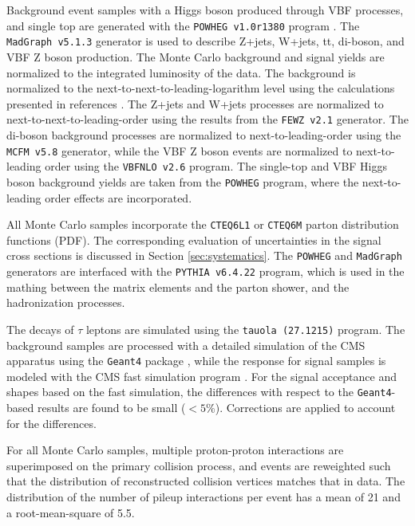 Background event samples with a Higgs boson produced through VBF processes, and single top are generated with the \texttt{POWHEG v1.0r1380} program \cite{Frixione:2007vw}. 
The \texttt{MadGraph v5.1.3} generator is used to describe Z+jets, W+jets, tt, di-boson, and VBF Z boson production. The Monte Carlo background and signal yields are normalized to the integrated luminosity of the data. 
The \ttbar background is normalized to the next-to-next-to-leading-logarithm level using the calculations presented in references \cite{Czakon:2013goa,Melnikov:2006kv}. 
The Z+jets and W+jets processes are normalized to next-to-next-to-leading-order using the results from the \texttt{FEWZ v2.1} \cite{Gavin:2010az} generator. 
The di-boson background processes are normalized to next-to-leading-order using the \texttt{MCFM v5.8} \cite{Campbell:2010ff} generator, while the VBF Z boson events are normalized to next-to-leading order using the \texttt{VBFNLO v2.6} \cite{Arnold:2008rz,Arnold:2011wj}program. 
The single-top and VBF Higgs boson background yields are taken from the \texttt{POWHEG} program, where the next-to-leading order effects are incorporated.

All Monte Carlo samples incorporate the \texttt{CTEQ6L1} \cite{Pumplin:2002vw} or \texttt{CTEQ6M} \cite{Nadolsky:2008zw} parton distribution functions (PDF). The corresponding evaluation of uncertainties in the signal cross sections is discussed in Section \ref{sec:systematics}. The \texttt{POWHEG} and \texttt{MadGraph} generators are interfaced with the \texttt{PYTHIA v6.4.22} \cite{Sjostrand:2006za} program, which is used in the mathing between the matrix elements and the parton shower, and the hadronization processes. 


The decays of $\tau$ leptons are simulated using the \texttt{tauola (27.1215)} \cite{Davidson:2010rw} program. The background samples are processed with a detailed simulation of the CMS apparatus using the \texttt{Geant4} package \cite{Agostinelli:2002hh}, while the response for signal samples is modeled with the CMS fast simulation program \cite{Abdullin:2011zz}. For the signal acceptance and \mjj shapes based on the fast simulation, the differences with respect to the \texttt{Geant4}-based results are found to be small ($< 5\%$). Corrections are applied to account for the differences. 

For all Monte Carlo samples, multiple proton-proton interactions are superimposed on the primary collision process, and events are reweighted such that the distribution of reconstructed collision vertices matches that in data. The distribution of the number of pileup interactions per event has a mean of 21 and a root-mean-square of 5.5. 

